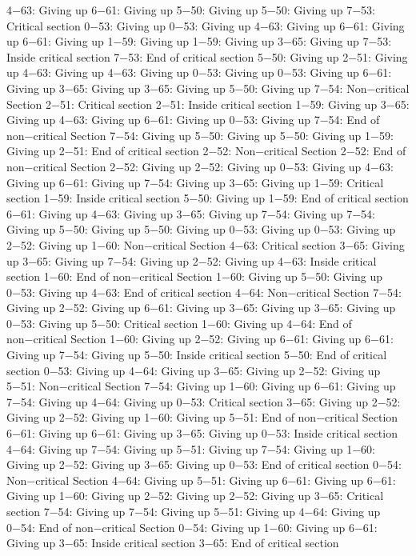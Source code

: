 4−63: Giving up
6−61: Giving up
5−50: Giving up
5−50: Giving up
7−53: Critical section
0−53: Giving up
0−53: Giving up
4−63: Giving up
6−61: Giving up
6−61: Giving up
1−59: Giving up
1−59: Giving up
3−65: Giving up
7−53: Inside critical section
7−53: End of critical section
5−50: Giving up
2−51: Giving up
4−63: Giving up
4−63: Giving up
0−53: Giving up
0−53: Giving up
6−61: Giving up
3−65: Giving up
3−65: Giving up
5−50: Giving up
7−54: Non−critical Section
2−51: Critical section
2−51: Inside critical section
1−59: Giving up
3−65: Giving up
4−63: Giving up
6−61: Giving up
0−53: Giving up
7−54: End of non−critical Section
7−54: Giving up
5−50: Giving up
5−50: Giving up
1−59: Giving up
2−51: End of critical section
2−52: Non−critical Section
2−52: End of non−critical Section
2−52: Giving up
2−52: Giving up
0−53: Giving up
4−63: Giving up
6−61: Giving up
7−54: Giving up
3−65: Giving up
1−59: Critical section
1−59: Inside critical section
5−50: Giving up
1−59: End of critical section
6−61: Giving up
4−63: Giving up
3−65: Giving up
7−54: Giving up
7−54: Giving up
5−50: Giving up
5−50: Giving up
0−53: Giving up
0−53: Giving up
2−52: Giving up
1−60: Non−critical Section
4−63: Critical section
3−65: Giving up
3−65: Giving up
7−54: Giving up
2−52: Giving up
4−63: Inside critical section
1−60: End of non−critical Section
1−60: Giving up
5−50: Giving up
0−53: Giving up
4−63: End of critical section
4−64: Non−critical Section
7−54: Giving up
2−52: Giving up
6−61: Giving up
3−65: Giving up
3−65: Giving up
0−53: Giving up
5−50: Critical section
1−60: Giving up
4−64: End of non−critical Section
1−60: Giving up
2−52: Giving up
6−61: Giving up
6−61: Giving up
7−54: Giving up
5−50: Inside critical section
5−50: End of critical section
0−53: Giving up
4−64: Giving up
3−65: Giving up
2−52: Giving up
5−51: Non−critical Section
7−54: Giving up
1−60: Giving up
6−61: Giving up
7−54: Giving up
4−64: Giving up
0−53: Critical section
3−65: Giving up
2−52: Giving up
2−52: Giving up
1−60: Giving up
5−51: End of non−critical Section
6−61: Giving up
6−61: Giving up
3−65: Giving up
0−53: Inside critical section
4−64: Giving up
7−54: Giving up
5−51: Giving up
7−54: Giving up
1−60: Giving up
2−52: Giving up
3−65: Giving up
0−53: End of critical section
0−54: Non−critical Section
4−64: Giving up
5−51: Giving up
6−61: Giving up
6−61: Giving up
1−60: Giving up
2−52: Giving up
2−52: Giving up
3−65: Critical section
7−54: Giving up
7−54: Giving up
5−51: Giving up
4−64: Giving up
0−54: End of non−critical Section
0−54: Giving up
1−60: Giving up
6−61: Giving up
3−65: Inside critical section
3−65: End of critical section
